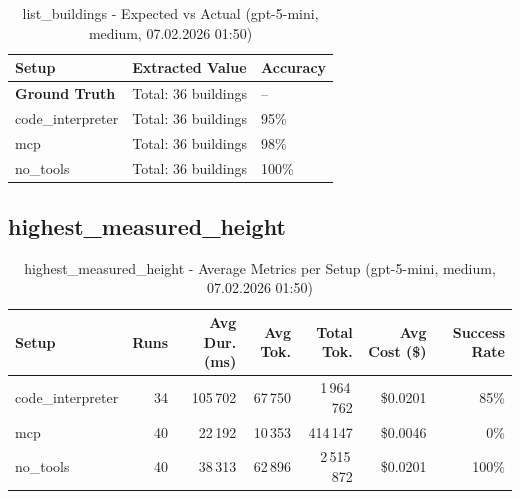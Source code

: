 \documentclass[a4paper,11pt]{article}
\begin{document}
\begin{table}[H]
\centering
\scriptsize
\caption{list\_buildings - Expected vs Actual (gpt-5-mini, medium, 07.02.2026 01:50)}
\begin{tabular}{l l l}
\toprule
Setup & Extracted Value & Accuracy \\
\midrule
\textbf{Ground Truth} & Total: 36 buildings & -- \\
\midrule
code\_interpreter & Total: 36 buildings & 95\% \\
mcp & Total: 36 buildings & 98\% \\
no\_tools & Total: 36 buildings & 100\% \\
\bottomrule
\end{tabular}
\end{table}

\clearpage

\subsection{highest\_measured\_height}

\begin{table}[H]
\centering
\scriptsize
\caption{highest\_measured\_height - Average Metrics per Setup (gpt-5-mini, medium, 07.02.2026 01:50)}
\label{tab:combined\_highest\_measured\_height\_metrics\_20260207}
\begin{tabular}{l r r r r r r}
\toprule
Setup & Runs & Avg Dur. (ms) & Avg Tok. & Total Tok. & Avg Cost (\$) & Success Rate \\
\midrule
code\_interpreter & 34 & 105\,702 & 67\,750 & 1\,964\,762 & \$0.0201 & 85\% \\
mcp & 40 & 22\,192 & 10\,353 & 414\,147 & \$0.0046 & 0\% \\
no\_tools & 40 & 38\,313 & 62\,896 & 2\,515\,872 & \$0.0201 & 100\% \\
\bottomrule
\end{tabular}
\end{table}
\end{document}
